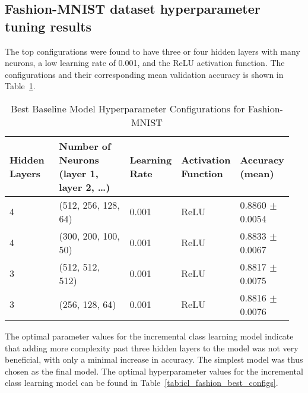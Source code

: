 \documentclass[conference]{IEEEtran}
\begin{document}
\subsection{Fashion-MNIST dataset hyperparameter tuning results}
 The top configurations were found to have three or four hidden layers with many neurons, a low 
 learning rate of 0.001, and the ReLU activation function. The configurations and their 
 corresponding mean validation accuracy is shown in Table~\ref{tab:baseline_fashion_mnist_best_configs}. 
\begin{table}[H]
  \centering
  \begin{minipage}{0.85\linewidth}
    \centering
    \caption{Best Baseline Model Hyperparameter Configurations for Fashion-MNIST}
    \label{tab:baseline_fashion_mnist_best_configs}
    \scriptsize
    \setlength{\tabcolsep}{4pt}
    \begin{tabular}{@{}p{0.19\linewidth} p{0.31\linewidth} p{0.15\linewidth} p{0.15\linewidth} p{0.15\linewidth}@{}}
      \toprule
      \shortstack{Hidden\\Layers} &
      \shortstack{Number of Neurons\\(layer 1, layer 2, \dots)} &
      \shortstack{Learning\\Rate} &
      \shortstack{Activation\\Function} &
      \shortstack{Accuracy\\(mean)} \\
      \midrule
      4 & (512, 256, 128, 64)   & 0.001  & ReLU & 0.8860 $\pm$ 0.0054 \\
      4 & (300, 200, 100, 50)   & 0.001  & ReLU & 0.8833 $\pm$ 0.0067 \\
      3 & (512, 512, 512)  & 0.001 & ReLU & 0.8817 $\pm$ 0.0075 \\
      3 & (256, 128, 64)   & 0.001  & ReLU & 0.8816 $\pm$ 0.0076 \\
      \bottomrule
    \end{tabular}
  \end{minipage}
\end{table}
The optimal parameter values for the incremental class learning model indicate that adding more complexity past three hidden layers to the model was 
not very beneficial, with only a minimal increase in accuracy. The simplest model was thus chosen as the final model. 
The optimal hyperparameter values for the incremental class learning model can be found in Table~\ref{tab:icl_fashion_best_configs}. 
\end{document}
